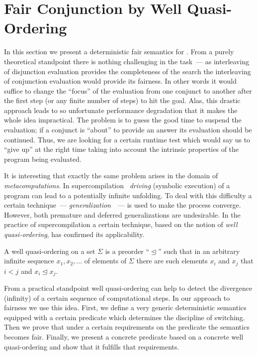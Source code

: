 \section{Fair Conjunction by Well Quasi-Ordering}
\label{sec:fair-semantics}

In this section we present a deterministic fair semantics for \mk. From a purely theoretical standpoint there is nothing challenging in the task~--- 
as interleaving of disjunction evaluation provides the completeness of the search the interleaving of conjunction evaluation would provide its fairness. In other words it
would suffice to change the ``focus'' of the evaluation from one conjunct to another after the first step (or any finite number of steps) to hit the goal. Alas,
this drastic approach leads to so unfortunate performance degradation that it makes the whole idea impractical. The problem is to guess the good time to suspend the
evaluation; if a conjunct is ``about'' to provide an answer its evaluation should be continued. Thus, we are looking for a certain runtime test which would say
us to ``give up'' at the right time taking into account the intrinsic properties of the program being evaluated.

It is interesting that exactly the same problem arises in the domain of \emph{metacomputations}. In supercompilation~\cite{Turchin}
\emph{driving} (symbolic execution) of a program can lead to a potentially infinite unfolding. To deal with this difficulty a certain technique~---
\emph{generalization}~\cite{Sorensen95analgorithm}~--- is used to make the process converge. However, both premature and deferred generalizations are undesirable.
In the practice of supercompilation a certain technique, based on the notion of \emph{well quasi-ordering}, has confirmed its applicability.

\begin{definition}
  A well quasi-ordering on a set $\Sigma$ is a preorder ``$\trianglelefteq$'' such that in an arbitrary infinite sequence $x_1,x_2,\dots$ of elements
  of $\Sigma$ there are such elements $x_i$ and $x_j$ that $i<j$ and $x_i\trianglelefteq x_j$.
\end{definition}

From a practical standpoint well quasi-ordering can help to detect the divergence (infinity) of a certain sequence of computational steps. In our approach
to fairness we use this idea. First, we define a very generic deterministic semantics equipped with a certain predicate which determines the discipline of
switching. Then we prove that under a certain requirements on the predicate the semantics becomes fair. Finally, we present a concrete predicate based on
a concrete well quasi-ordering and show that it fulfills that requirements.


